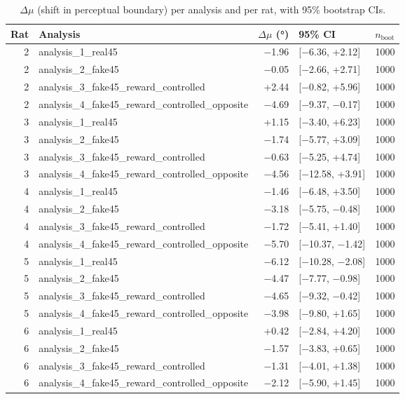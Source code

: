 \begin{table}[htbp]
  \centering
  \caption{$\Delta\mu$ (shift in perceptual boundary) per analysis and per rat, with 95\% bootstrap CIs.}
  \label{tab:choice_delta_mu}
  \begin{tabular}{rlrlr}
    \toprule
    Rat & Analysis & $\Delta\mu$ (°) & 95\% CI & $n_{\mathrm{boot}}$ \\
    \midrule
    2 & analysis\_1\_real45 & −1.96 & [−6.36, +2.12] & 1000 \\
    2 & analysis\_2\_fake45 & −0.05 & [−2.66, +2.71] & 1000 \\
    2 & analysis\_3\_fake45\_reward\_controlled & +2.44 & [−0.82, +5.96] & 1000 \\
    2 & analysis\_4\_fake45\_reward\_controlled\_opposite & −4.69 & [−9.37, −0.17] & 1000 \\
    3 & analysis\_1\_real45 & +1.15 & [−3.40, +6.23] & 1000 \\
    3 & analysis\_2\_fake45 & −1.74 & [−5.77, +3.09] & 1000 \\
    3 & analysis\_3\_fake45\_reward\_controlled & −0.63 & [−5.25, +4.74] & 1000 \\
    3 & analysis\_4\_fake45\_reward\_controlled\_opposite & −4.56 & [−12.58, +3.91] & 1000 \\
    4 & analysis\_1\_real45 & −1.46 & [−6.48, +3.50] & 1000 \\
    4 & analysis\_2\_fake45 & −3.18 & [−5.75, −0.48] & 1000 \\
    4 & analysis\_3\_fake45\_reward\_controlled & −1.72 & [−5.41, +1.40] & 1000 \\
    4 & analysis\_4\_fake45\_reward\_controlled\_opposite & −5.70 & [−10.37, −1.42] & 1000 \\
    5 & analysis\_1\_real45 & −6.12 & [−10.28, −2.08] & 1000 \\
    5 & analysis\_2\_fake45 & −4.47 & [−7.77, −0.98] & 1000 \\
    5 & analysis\_3\_fake45\_reward\_controlled & −4.65 & [−9.32, −0.42] & 1000 \\
    5 & analysis\_4\_fake45\_reward\_controlled\_opposite & −3.98 & [−9.80, +1.65] & 1000 \\
    6 & analysis\_1\_real45 & +0.42 & [−2.84, +4.20] & 1000 \\
    6 & analysis\_2\_fake45 & −1.57 & [−3.83, +0.65] & 1000 \\
    6 & analysis\_3\_fake45\_reward\_controlled & −1.31 & [−4.01, +1.38] & 1000 \\
    6 & analysis\_4\_fake45\_reward\_controlled\_opposite & −2.12 & [−5.90, +1.45] & 1000 \\

\end{tabular}
\end{table}
